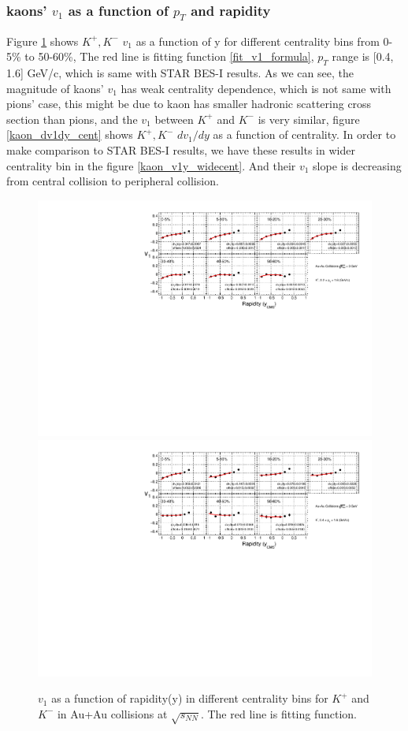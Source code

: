 \subsubsection{kaons' $v_{1}$ as a function of $p_{T}$ and rapidity}
Figure \ref{kaon_v1y_cent} shows $K^{+}, K^{-}$ $v_{1}$ as a function of y for different centrality bins from 0-5\% to 50-60\%, The red line is fitting function \ref{fit_v1_formula}, $p_{T}$ range is [0.4, 1.6] GeV/c, which is same with STAR BES-I results. As we can see, the magnitude of kaons' $v_{1}$ has weak centrality dependence, which is not same with pions' case, this might be due to kaon has smaller hadronic scattering cross section than pions, and the $v_{1}$ between $K^{+}$ and $K^{-}$ is very similar, figure \ref{kaon_dv1dy_cent} shows $K^{+}, K^{-}$ $dv_{1}/dy$ as a function of centrality. In order to make comparison to STAR BES-I results, we have these results in wider centrality bin in the figure \ref{kaon_v1y_widecent}. And their $v_{1}$ slope is decreasing from central collision to peripheral collision.


\begin{figure}[h]
\includegraphics[scale=0.5]{chapter3/fig/v1ypikp/v1kaonp_cent.pdf}
\includegraphics[scale=0.5]{chapter3/fig/v1ypikp/v1kaonm_cent.pdf}
\caption{\label{kaon_v1y_cent} $v_{1}$ as a function of rapidity(y) in different centrality bins for $K^{+}$ and $K^{-}$ in Au+Au collisions at $\sqrt{s_{NN}}$. The red line is fitting function.}
\end{figure}

